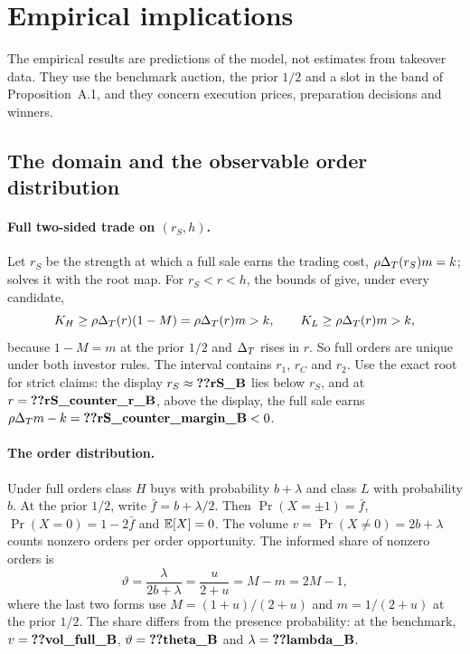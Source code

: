 \section{Empirical implications}\label{sec:12_empirical}

The empirical results are predictions of the model, not estimates from takeover data. They use the benchmark
auction, the prior \(1/2\) and a slot in the band of Proposition~A.1, and they concern execution prices, preparation
decisions and winners. 

\subsection{The domain and the observable order distribution}\label{sec:12_empirical-domain}

\paragraph{Full two-sided trade on \((r_S,h)\).} Let \(r_S\) be the strength at which a full sale earns the trading
cost, \(\rho\Delta_T(r_S)m=k\);  solves it with the root map. For \(r_S<r<h\), the
bounds of  give, under every candidate,
\[
K_H\ge\rho\Delta_T(r)(1-M)=\rho\Delta_T(r)m>k,\qquad K_L\ge\rho\Delta_T(r)m>k,
\]
because \(1-M=m\) at the prior \(1/2\) and \(\Delta_T\) rises in \(r\). So full orders are unique under both investor rules.
The interval contains \(r_1\), \(r_C\) and \(r_2\). Use the exact root for strict claims: the display
\(r_S\approx\reg{rS_B}\) lies below \(r_S\), and at \(r=\reg{rS_counter_r_B}\), above the display, the full sale
earns \(\rho\DT m-k=\reg{rS_counter_margin_B}<0\).

\paragraph{The order distribution.} Under full orders class \(H\) buys with probability \(b+\lambda\) and class \(L\) with
probability \(b\). At the prior \(1/2\), write \(\bar f=b+\lambda/2\). Then \(\Pr(X=\pm1)=\bar f\),
\(\Pr(X=0)=1-2\bar f\) and \(\mathbb{E}[X]=0\). The volume \(v=\Pr(X\ne0)=2b+\lambda\) counts nonzero orders per order
opportunity. The informed share of nonzero orders is
\[
\vartheta=\frac{\lambda}{2b+\lambda}=\frac{u}{2+u}=M-m=2M-1,
\]
where the last two forms use \(M=(1+u)/(2+u)\) and \(m=1/(2+u)\) at the prior \(1/2\). The share differs from the
presence probability: at the benchmark, \(v=\reg{vol_full_B}\), \(\vartheta=\reg{theta_B}\) and
\(\lambda=\reg{lambda_B}\).


